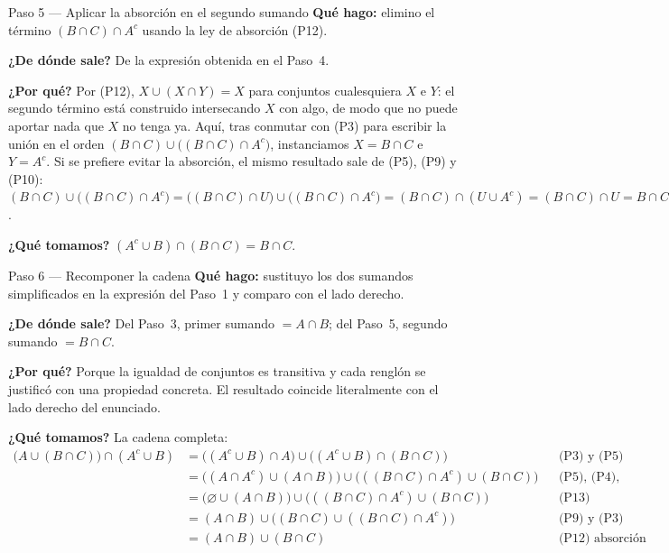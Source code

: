 \documentclass[11pt]{article}
\begin{document}
\begin{paso}{Paso 5 --- Aplicar la absorción en el segundo sumando}
\textbf{Qué hago:} elimino el término $(B\cap C)\cap A^{c}$ usando la ley de absorción (P12).

\textbf{¿De dónde sale?} De la expresión obtenida en el Paso~4.

\textbf{¿Por qué?} Por (P12), $X\cup(X\cap Y)=X$ para conjuntos cualesquiera $X$ e $Y$: el
segundo término está construido intersecando $X$ con algo, de modo que no puede aportar nada que
$X$ no tenga ya. Aquí, tras conmutar con (P3) para escribir la unión en el orden
$(B\cap C)\cup\bigl((B\cap C)\cap A^{c}\bigr)$, instanciamos $X=B\cap C$ e $Y=A^{c}$. Si se
prefiere evitar la absorción, el mismo resultado sale de (P5), (P9) y (P10):
$(B\cap C)\cup\bigl((B\cap C)\cap A^{c}\bigr)=\bigl((B\cap C)\cap U\bigr)\cup\bigl((B\cap C)\cap A^{c}\bigr)
=(B\cap C)\cap(U\cup A^{c})=(B\cap C)\cap U=B\cap C$.

\textbf{¿Qué tomamos?} $(A^{c}\cup B)\cap(B\cap C)=B\cap C$.
\end{paso}

\begin{paso}{Paso 6 --- Recomponer la cadena}
\textbf{Qué hago:} sustituyo los dos sumandos simplificados en la expresión del Paso~1 y comparo
con el lado derecho.

\textbf{¿De dónde sale?} Del Paso~3, primer sumando $=A\cap B$; del Paso~5, segundo sumando
$=B\cap C$.

\textbf{¿Por qué?} Porque la igualdad de conjuntos es transitiva y cada renglón se justificó con
una propiedad concreta. El resultado coincide literalmente con el lado derecho del enunciado.

\textbf{¿Qué tomamos?} La cadena completa:
\begin{align*}
\bigl(A\cup(B\cap C)\bigr)\cap(A^{c}\cup B)
&=\bigl((A^{c}\cup B)\cap A\bigr)\cup\bigl((A^{c}\cup B)\cap(B\cap C)\bigr) && \text{(P3) y (P5)}\\
&=\bigl((A\cap A^{c})\cup(A\cap B)\bigr)\cup\bigl(((B\cap C)\cap A^{c})\cup(B\cap C)\bigr) && \text{(P5), (P4), (P11)}\\
&=\bigl(\varnothing\cup(A\cap B)\bigr)\cup\bigl(((B\cap C)\cap A^{c})\cup(B\cap C)\bigr) && \text{(P13) complementación}\\
&=(A\cap B)\cup\bigl((B\cap C)\cup((B\cap C)\cap A^{c})\bigr) && \text{(P9) y (P3)}\\
&=(A\cap B)\cup(B\cap C) && \text{(P12) absorción}
\end{align*}
\end{paso}
\end{document}
